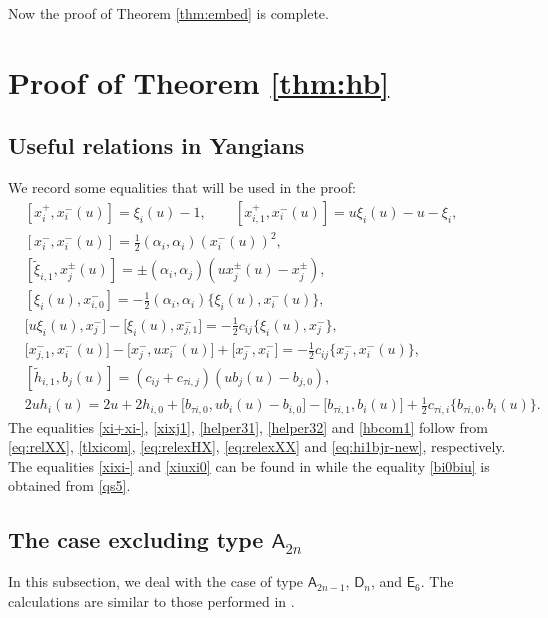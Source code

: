 \documentclass[11pt,reqno]{amsart}
\numberwithin{equation}{section}
\theoremstyle{definition}
\theoremstyle{remark}
\newcommand{\tl}{\tilde}
\begin{document}
Now the proof of Theorem \ref{thm:embed} is complete.

\section{Proof of Theorem \ref{thm:hb}}\label{sec:proof-thmC}
\subsection{Useful relations in Yangians}
We record some equalities that will be used in the proof:
\begin{align}
&[x_i^+,x_i^-(u)]=\xi_i(u)-1,\qquad [x_{i,1}^+,x_i^-(u)]
=
u\xi_i(u)-u-\xi_i,\label{xi+xi-}\\
&[x_i^-,x_i^-(u)]=\tfrac12(\alpha_i,\alpha_i)(x_i^-(u))^2,\label{xixi-}\\
&[\tl\xi_{i,1},x_{j}^\pm(u)]=\pm(\alpha_i,\alpha_j)(ux_j^\pm(u)-x_{j}^\pm),\label{xixj1}\\
&[\xi_i(u),x_{i,0}^-]=-\tfrac12(\alpha_i,\alpha_i)\{\xi_i(u),x_i^-(u)\},\label{xiuxi0}\\
&\bigl[u\xi_i(u),x_j^-\bigr]
-\bigl[\xi_i(u),x_{j,1}^-\bigr]
=
-\tfrac{1}{2}c_{ij}
 \bigl\{\xi_i(u),x_j^-\bigr\},\label{helper31}\\
&\bigl[x_{j,1}^-,x_i^-(u)\bigr]
-\bigl[x_j^-,u x_i^-(u)\bigr]
+\bigl[x_j^-,x_i^-\bigr]
=
-\tfrac{1}{2}c_{ij}
 \bigl\{x_j^-,x_i^-(u)\bigr\},\label{helper32}\\
&[\tl h_{i,1},b_j(u)]=(c_{ij}+c_{\tau i,j})(ub_j(u)-b_{j,0}),\label{hbcom1}\\
&2u h_{i}(u)
=
2u+2h_{i,0}
+\bigl[b_{\tau i,0},u b_i(u)-b_{i,0}\bigr]
-\bigl[b_{\tau i,1},b_i(u)\bigr]
+\tfrac{1}{2}c_{\tau i,i}\bigl\{b_{\tau i,0},b_i(u)\bigr\}.\label{bi0biu}
\end{align}
The equalities \eqref{xi+xi-}, \eqref{xixj1}, \eqref{helper31}, \eqref{helper32} and \eqref{hbcom1} follow from \eqref{eq:relXX},  \eqref{tlxicom}, \eqref{eq:relexHX}, \eqref{eq:relexXX} and \eqref{eq:hi1bjr-new}, respectively. The equalities \eqref{xixi-} and \eqref{xiuxi0} can be found in \cite[\S2.4]{GTL16} while the equality \eqref{bi0biu} is obtained from \eqref{qs5}. 

\subsection{The case excluding type $\mathsf A_{2n}$}\label{sec:noA2n}
In this subsection, we deal with the case of type $\mathsf A_{2n-1}$, $\mathsf D_n$, and $\mathsf E_6$. The calculations are similar to those performed in \cite{Lu26min}.
\end{document}
